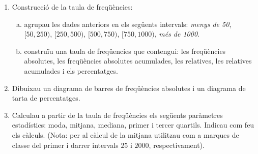 \documentclass[a4paper,12pt]{report}
\begin{document}
\begin{enumerate}
\item Construcció de la taula de freqüències:
\begin{enumerate}[a)]
\item agrupau les dades anteriors en els següents intervals:
\textit{menys de 50}, $[50, 250)$, $[250, 500)$, $[500, 750)$, $[750, 1000)$, \textit{més de 1000}. 
\item construïu una taula de freqüencies que contengui: les freqüències absolutes, les freqüències
absolutes acumulades, les relatives, les relatives acumulades i els percentatges.
\end{enumerate}
\item Dibuixau un diagrama de barres de freqüències absolutes i un diagrama de tarta de percentatges.

\item Calculau a partir de la taula de freqüències els següents paràmetres estadístics: 
moda, mitjana, mediana, primer i tercer quartils. Indicau com feu els càlculs.
(Nota: per al càlcul de la mitjana utilitzau com a marques de classe del primer i
darrer intervals $25$ i $2000$, respectivament).

\end{enumerate}
\end{document}
